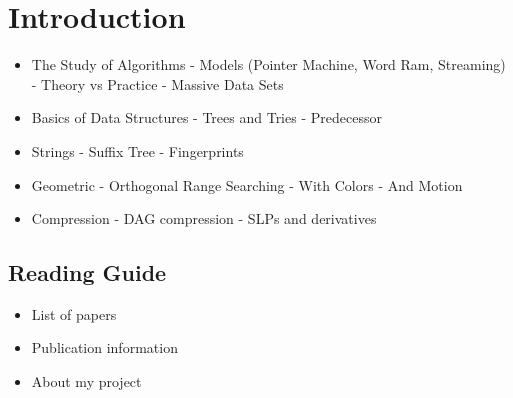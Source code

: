 \chapter{Introduction}

\begin{itemize}
    \item The Study of Algorithms
        - Models (Pointer Machine, Word Ram, Streaming)
        - Theory vs Practice
        - Massive Data Sets
    \item Basics of Data Structures
        - Trees and Tries
        - Predecessor
    \item Strings
        - Suffix Tree
        - Fingerprints
    \item Geometric
        - Orthogonal Range Searching
        - With Colors
        - And Motion
    \item Compression
        - DAG compression
        - SLPs and derivatives
\end{itemize}



\section{Reading Guide}
\begin{itemize}
    \item List of papers
    \item Publication information
    \item About my project
\end{itemize}


